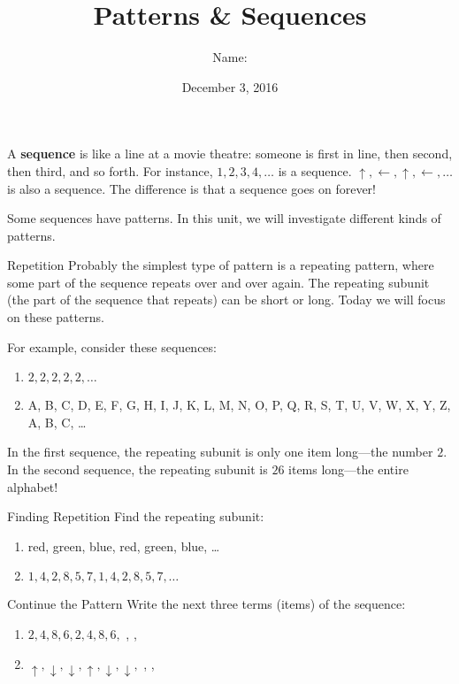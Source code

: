\documentclass[12pt,letterpaper]{article}
\title{Patterns \& Sequences}
\author{Name: \underline{\hspace{5cm}}}
\date{December 3, 2016}
\begin{document}
\HomeworkTitle

\thispagestyle{empty}

A \textbf{sequence} is like a line at a movie theatre: someone is first in line,
then second, then third, and so forth. For instance, $1, 2, 3, 4, \ldots$ is a
sequence. $\uparrow, \leftarrow, \uparrow, \leftarrow, \ldots$ is also a
sequence. The difference is that a sequence goes on forever!

Some sequences have patterns. In this unit, we will investigate different kinds
of patterns.

\begin{step}{Repetition}
Probably the simplest type of pattern is a repeating pattern, where some part of
the sequence repeats over and over again. The repeating subunit (the part of the
sequence that repeats) can be short or long. Today we will focus on these
patterns.

For example, consider these sequences:

\begin{enumerate}
\item $2, 2, 2, 2, 2, \ldots$
\item A, B, C, D, E, F, G, H, I, J, K, L, M, N, O, P, Q, R, S, T, U, V, W, X,
Y, Z, A, B, C, \ldots
\end{enumerate}

In the first sequence, the repeating subunit is only one item long---the number
$2$. In the second sequence, the repeating subunit is $26$ items long---the
entire alphabet!
\end{step}

\begin{problem}{Finding Repetition}
Find the repeating subunit:

\begin{enumerate}[\hspace{.5cm}a.]
\item red, green, blue, red, green, blue, \ldots
\item $1, 4, 2, 8, 5, 7, 1, 4, 2, 8, 5, 7, \ldots$
\end{enumerate}
\end{problem}

\begin{problem}{Continue the Pattern}
Write the next three terms (items) of the sequence:

\begin{enumerate}[\hspace{.5cm}a.]
\item $2, 4, 8, 6, 2, 4, 8, 6,$ \underline{\hspace{1em}},
\underline{\hspace{1em}}, \underline{\hspace{1em}}
\item $\uparrow, \downarrow, \downarrow, \uparrow, \downarrow, \downarrow,$
\underline{\hspace{1em}}, \underline{\hspace{1em}}, \underline{\hspace{1em}}
\end{enumerate}
\end{problem}
\end{document}
